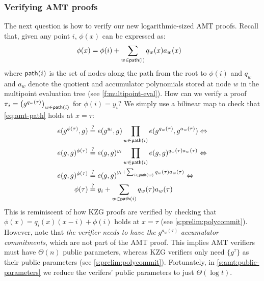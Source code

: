 \subsubsection{Verifying AMT proofs}
\label{s:amt:verifying-proofs}
The next question is how to verify our new logarithmic-sized AMT proofs.
Recall that, given any point $i$, $\phi(x)$ can be expressed as:
\begin{align}
\label{eq:amt-path}
\phi(x) &= \phi(i) + \sum_{w\in \mathsf{\treepath(i)}} q_w(x) a_w(x)
\end{align}
where $\mathsf{path}(i)$ is the set of nodes along the path from the root to $\phi(i)$ and $q_w$ and $a_w$ denote the quotient and accumulator polynomials stored at node $w$ in the multipoint evaluation tree (see \cref{f:multipoint-eval}).
How can we verify a proof $\pi_i = \left(g^{q_w(\tau)}\right)_{w\in\mathsf{path}(i)}$ for $\phi(i) = y_i$?
We simply use a bilinear map to check that \cref{eq:amt-path} holds at $x=\tau$:
\begin{align}
\label{eq:amt-verify}
e(g^{\phi(\tau)}, g) &\stackrel{?}{=} e(g^{y_i},g) \prod_{w\in\treepath(i)} e(g^{q_w(\tau)}, g^{a_w(\tau)}) \Leftrightarrow\\ \nonumber
e(g, g)^{\phi(\tau)} &\stackrel{?}{=} e(g,g)^{y_i} \prod_{w\in\treepath(i)} e(g,g)^{q_w(\tau) a_w(\tau)}\Leftrightarrow\\ \nonumber
e(g, g)^{\phi(\tau)} &\stackrel{?}{=} e(g,g)^{{y_i}+\sum_{i\in\treepath(w)} {q_w(\tau) a_w(\tau)}}\Leftrightarrow\\ \nonumber
         \phi(\tau)  &\stackrel{?}{=} {y_i}+\sum_{w\in\treepath(i)} {q_w(\tau) a_w(\tau)} 
\end{align}
This is reminiscent of how KZG proofs are verified by checking that $\phi(x) = q_i(x)(x-i) + \phi(i)$ holds at $x=\tau$ (see \cref{s:prelim:polycommit}).
However, note that \textit{the verifier needs to have the} $g^{a_w(\tau)}$ \textit{accumulator commitments}, which are not part of the AMT proof.
This implies AMT verifiers must have $\Theta(n)$ public parameters, whereas KZG verifiers only need $\{g^\tau\}$ as their public parameters (see \cref{s:prelim:polycommit}).
Fortunately, in \cref{s:amt:public-parameters} we reduce the verifers' public parameters to just $\Theta(\log{t})$.

